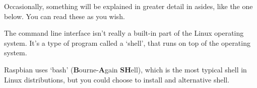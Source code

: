 Occasionally, something will be explained in greater detail in asides, like the one below. You can read these as you wish.
	
\begin{aside}
	The command line interface isn't really a built-in part of the Linux operating system. It's a type of program called a `shell', that runs on top of the operating system.
	
	Raspbian uses `bash' (\textbf{B}ourne-\textbf{A}gain \textbf{SH}ell), which is the most typical shell in Linux distributions, but you could choose to install and alternative shell.
\end{aside}